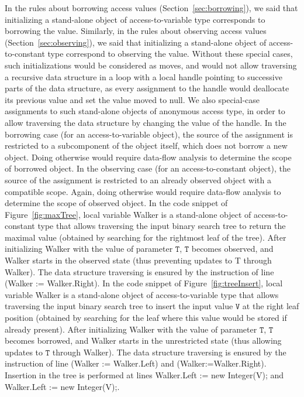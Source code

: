 \documentclass{llncs}
\newcommand\var[1]{\ensuremath{\mathtt{#1}}}
\begin{document}
In the rules about borrowing access values (Section~\ref{sec:borrowing}), we said that initializing a stand-alone object of access-to-variable type corresponds to
borrowing the value. Similarly, in the rules about observing access values (Section~\ref{sec:observing}), we said that initializing a stand-alone object of
access-to-constant type correspond to observing the value. Without these special cases, such initializations would be considered as moves, and would not allow
traversing a recursive data structure in a loop with a local handle pointing to successive parts of the data structure, as every assignment to the handle would
deallocate its previous value and set the value moved to null.
We also special-case assignments to such stand-alone objects of anonymous access type, in order to allow traversing the data structure by changing the value of the handle.
In the borrowing case (for an access-to-variable object), the source of the assignment is restricted to a subcomponent of the object itself, which does not borrow a new object.
Doing otherwise would require data-flow analysis to determine the scope of borrowed object. In the observing case (for an access-to-constant object), the source of
the assignment is restricted to an already observed object with a compatible scope. Again, doing otherwise would require data-flow analysis to determine the scope of observed object.
In the code snippet of Figure~\ref{fig:maxTree}, local variable Walker is a stand-alone object of access-to-constant type that allows traversing the input binary
search tree to return the maximal value (obtained by searching for the rightmost leaf of the tree). After initializing Walker with the value of parameter \var{T},
\var{T} becomes observed, and Walker starts in the observed state (thus preventing updates to T through Walker). The data structure traversing is ensured by the instruction
of line (Walker := Walker.Right). 
In the code snippet of Figure~\ref{fig:treeInsert}, local variable Walker is a stand-alone object of access-to-variable type that allows traversing the input binary
search tree to insert the input value \var{V} at the right leaf position (obtained by searching for the leaf where this value would be stored if already present).
After initializing Walker with the value of parameter \var{T}, \var{T} becomes borrowed, and Walker starts in the unrestricted state (thus allowing updates to \var{T} through Walker).
The data structure traversing is ensured by the instruction of line (Walker := Walker.Left)  and (Walker:=Walker.Right). Insertion in the tree is performed at lines
Walker.Left := new Integer(V); and Walker.Left := new Integer(V);.
\end{document}

